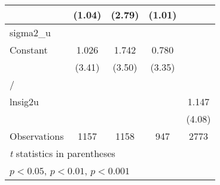 {\begin{longtable}{l*{4}{c}}
                &   (1.04)         &   (2.79)         &   (1.01)         &                  \\
\midrule
sigma2\_u        &                  &                  &                  &                  \\
Constant        &    1.026\sym{***}&    1.742\sym{***}&    0.780\sym{***}&                  \\
                &   (3.41)         &   (3.50)         &   (3.35)         &                  \\
\midrule
/               &                  &                  &                  &                  \\
lnsig2u         &                  &                  &                  &    1.147\sym{***}\\
                &                  &                  &                  &   (4.08)         \\
\midrule
Observations    &     1157         &     1158         &      947         &     2773         \\
\bottomrule
\multicolumn{5}{l}{\footnotesize \textit{t} statistics in parentheses}\\
\multicolumn{5}{l}{\footnotesize \sym{*} \(p<0.05\), \sym{**} \(p<0.01\), \sym{***} \(p<0.001\)}\\
\end{longtable}
}
